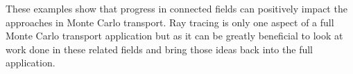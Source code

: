 These examples show that progress in connected fields can positively impact the approaches in Monte Carlo transport.
%
Ray tracing is only one aspect of a full Monte Carlo transport application but as it can be greatly beneficial to look at work done in these related fields and bring those ideas back into the full application.

